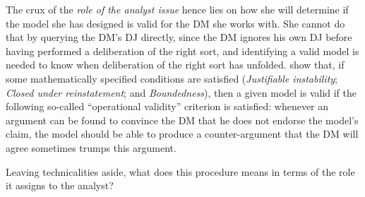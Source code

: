 \documentclass[version=3.21, pagesize, twoside=off, bibliography=totoc, DIV=calc, fontsize=12pt, a4paper, french, english]{scrartcl}
\begin{document}
The crux of the \emph{role of the analyst issue} hence lies on how she will determine if the model she has designed is valid for the \ac{DM} she works with. She cannot do that by querying the \ac{DM}’s \ac{DJ} directly, since the \ac{DM} ignores his own \ac{DJ} before having performed a deliberation of the right sort, and identifying a valid model is needed to know when deliberation of the right sort has unfolded. \citet{cailloux_formal_2019} show that, if some mathematically specified conditions are satisfied (\emph{Justifiable instability}; \emph{Closed under reinstatement}; and \emph{Boundedness}), then  a given model is valid  if the following so-called “operational validity” criterion is satisfied: whenever an argument can be found to convince the \ac{DM} that he does not endorse the model’s claim, the model should be able to produce a counter-argument that the \ac{DM} will agree sometimes trumps this argument.

Leaving technicalities aside, what does this procedure means in terms of the role it assigns to the analyst?
\end{document}
